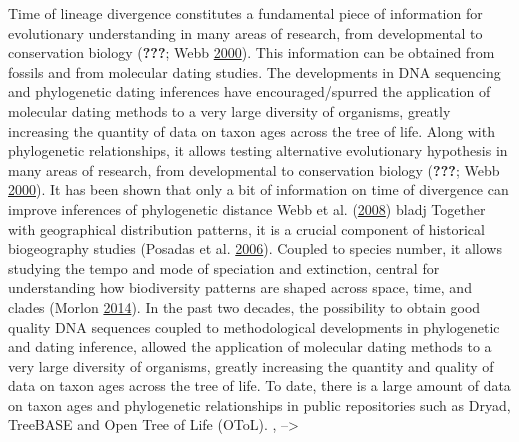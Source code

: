 \documentclass[]{article}
\title{}
\author{}
\date{}
\begin{document}
Time of lineage divergence
constitutes a fundamental piece of information for evolutionary
understanding in many areas of research, from developmental to conservation biology ({\textbf{???}}; Webb \protect\hyperlink{ref-Webb2000}{2000}). This information can be obtained from fossils and from molecular dating studies. The developments in DNA sequencing and phylogenetic dating inferences have encouraged/spurred the application of molecular dating methods to a very large diversity of organisms, greatly increasing the quantity
of data on taxon ages across the tree of life.
Along with phylogenetic relationships, it allows testing alternative
evolutionary hypothesis in many areas of research, from developmental to conservation biology ({\textbf{???}}; Webb \protect\hyperlink{ref-Webb2000}{2000}).
It has been shown that only a bit of information on time of divergence can improve inferences of phylogenetic distance Webb et al. (\protect\hyperlink{ref-Webb2008}{2008}) bladj
Together with geographical distribution patterns, it is a crucial component of historical biogeography studies (Posadas et al. \protect\hyperlink{ref-posadas2006historical}{2006}).
Coupled to species number, it allows studying the tempo and mode of speciation and extinction,
central for understanding how biodiversity
patterns are shaped across space, time, and clades (Morlon \protect\hyperlink{ref-Morlon2014}{2014}).
In the past two decades, the possibility to obtain good quality DNA sequences
coupled to methodological developments in phylogenetic and dating inference, allowed
the application of molecular dating methods to a very large diversity
of organisms, greatly increasing the quantity and quality of data on taxon ages across the tree of life.
To date, there is a large amount of
data on taxon ages and phylogenetic relationships in public repositories such as Dryad, TreeBASE
and Open Tree of Life (OToL).
, --\textgreater{}
\end{document}

